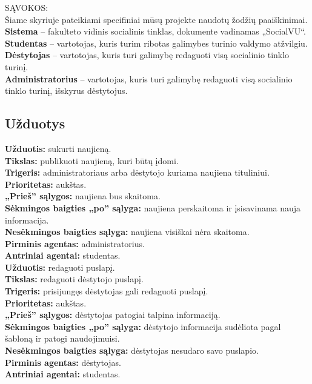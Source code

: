 \documentclass{VUMIFPSkursinis}
\begin{document}
SĄVOKOS: \\
Šiame skyriuje pateikiami specifiniai mūsų projekte naudotų žodžių paaiškinimai. \\
\textbf{Sistema} – fakulteto vidinis socialinis tinklas, dokumente vadinamas „SocialVU“. \\
\textbf{Studentas} – vartotojas, kuris turim ribotas galimybes turinio valdymo atžvilgiu.\\
\textbf{Dėstytojas} – vartotojas, kuris turi galimybę redaguoti visą socialinio tinklo turinį.\\
\textbf{Administratorius} – vartotojas, kuris turi galimybę redaguoti visą socialinio tinklo turinį, išskyrus dėstytojus.

\subsection{Užduotys}
\setlength{\parindent}{0pt}\textbf{Užduotis:} sukurti naujieną. \\
\textbf{Tikslas:} publikuoti naujieną, kuri būtų įdomi.\\
\textbf{Trigeris:} administratoriaus arba dėstytojo kuriama naujiena tituliniui. \\
\textbf{Prioritetas:} aukštas. \\
\textbf{„Prieš” sąlygos:} naujiena bus skaitoma.\\
\textbf{Sėkmingos baigties „po” sąlyga:} naujiena perskaitoma ir įsisavinama nauja informacija. \\
\textbf{Nesėkmingos baigties sąlyga:} naujiena visiškai nėra skaitoma. \\
\textbf{Pirminis agentas:} administratorius. \\
\textbf{Antriniai agentai:} studentas. \\

\setlength{\parindent}{0pt}\textbf{Užduotis:} redaguoti puslapį. \\
\textbf{Tikslas:} redaguoti dėstytojo puslapį.\\
\textbf{Trigeris:} prisijungęs dėstytojas gali redaguoti puslapį. \\
\textbf{Prioritetas:} aukštas. \\
\textbf{„Prieš” sąlygos:} dėstytojas patogiai talpina informaciją.\\
\textbf{Sėkmingos baigties „po” sąlyga:} dėstytojo informacija sudėliota pagal šabloną ir patogi naudojimuisi. \\
\textbf{Nesėkmingos baigties sąlyga:} dėstytojas nesudaro savo puslapio. \\
\textbf{Pirminis agentas:} dėstytojas. \\
\textbf{Antriniai agentai:} studentas. \\
\end{document}
